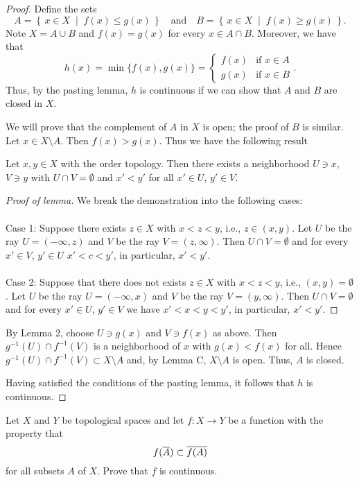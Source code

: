 \begin{proof}
Define the sets
\[
A=\left\{\,x\in X\;\middle|\;f(x)\leq g(x)\,\right\}
\quad\text{and}\quad
B=\left\{\,x\in X\;\middle|\;f(x)\geq g(x)\,\right\}.
\]
Note $X=A\cup B$ and $f(x)=g(x)$ for every $x\in A\cap
B$. Moreover, we have that
\[
h(x)
=\min\{f(x),g(x)\}
=\begin{cases}
f(x)&\text{if $x\in A$}\\
g(x)&\text{if $x\in B$}
\end{cases}.
\]
Thus, by the pasting lemma, $h$ is continuous if we can show that
$A$ and $B$ are closed in $X$.

We will prove that the complement of $A$ in $X$ is open; the
proof of $B$ is similar. Let $x\in X\setminus A$. Then
$f(x)>g(x)$. Thus we have the following result
\begin{lemma}
Let $x,y\in X$ with the order topology. Then there exists a
neighborhood $U\ni x$, $V\ni y$ with $U\cap V=\emptyset$ and
$x'<y'$ for all $x'\in U$, $y'\in V$.
\end{lemma}
\begin{proof}[Proof of lemma]
\renewcommand\qedsymbol{$\clubsuit$}
We break the demonstration into the following cases:
\\\\
Case 1: Suppose there exists $z\in X$ with $x<z<y$, i.e.,
$z\in(x,y)$. Let $U$ be the ray $U=(-\infty,z)$ and $V$ be the
ray $V=(z,\infty)$. Then $U\cap V=\emptyset$ and for every $x'\in
V$, $y'\in U$ $x'<c<y'$, in particular, $x'<y'$.
\\\\
Case 2: Suppose that there does not exists $z\in X$ with $x<z<y$,
i.e., $(x,y)=\emptyset$. Let $U$ be the ray $U=(-\infty,x)$ and
$V$ be the ray $V=(y,\infty)$. Then $U\cap V=\emptyset$ and for
every $x'\in U$, $y'\in V$ we have $x'<x<y<y'$, in particular,
$x'<y'$.
\end{proof}

By Lemma 2, choose $U\ni g(x)$ and $V\ni f(x)$ as above. Then
$g^{-1}(U)\cap f^{-1}(V)$ is a neighborhood of $x$ with
$g(x)<f(x)$ for all. Hence $g^{-1}(U)\cap f^{-1}(V)\subset
X\setminus A$ and, by Lemma C, $X\setminus A$ is open. Thus, $A$
is closed.

Having satisfied the conditions of the pasting lemma, it follows
that $h$ is continuous.
\end{proof}
\begin{problem}
Let $X$ and $Y$ be topological spaces and let $f\colon X\to Y$ be
a function with the property that
\[
f(\overline{A})\subset\overline{f(A)}
\]
for all subsets $A$ of $X$. Prove that $f$ is continuous.
\end{problem}
